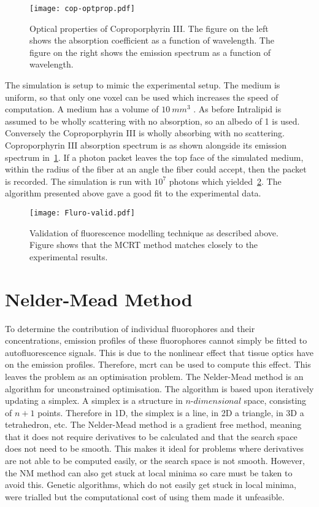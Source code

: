 \begin{figure}[!htpb]
	\centering
	\texttt{[image: cop-optprop.pdf]}
	\caption{Optical properties of Coproporphyrin III. The figure on the left shows the absorption coefficient as a function of wavelength. The figure on the right shows the emission spectrum as a function of wavelength.}
	\label{fig:coporiii}
\end{figure}

The simulation is setup to mimic the experimental setup.
The medium is uniform, so that only one voxel can be used which increases the speed of computation.
A medium has a volume of $10~mm^3$ .
As before Intralipid is assumed to be wholly scattering with no absorption, so an albedo of 1 is used.
Conversely the Coproporphyrin III is wholly absorbing with no scattering.
Coproporphyrin III absorption spectrum is as shown alongside its emission spectrum in~\cref{fig:coporiii}.
If a photon packet leaves the top face of the simulated medium, within the radius of the fiber at an angle the fiber could accept, then the packet is recorded.
The simulation is run with $10^7$ photons which yielded~\cref{fig:flurovalid}.
The algorithm presented above gave a good fit to the experimental data.

\begin{figure}[!htpb]
  \centering
  \texttt{[image: Fluro-valid.pdf]}
  \caption{Validation of fluorescence modelling technique as described above. Figure shows that the MCRT method matches closely to the experimental results.}
  \label{fig:flurovalid}
\end{figure}

\FloatBarrier

\section{Nelder-Mead Method}

To determine the contribution of individual fluorophores and their concentrations, emission profiles of these fluorophores cannot simply be fitted to autofluorescence signals.
This is due to the nonlinear effect that tissue optics have on the emission profiles.
Therefore, \gls*{mcrt} can be used to compute this effect.
This leaves the problem as an optimisation problem.
The Nelder-Mead method is an algorithm for unconstrained optimisation. 
The algorithm is based upon iteratively updating a simplex. 
A simplex is a structure in $n$-$dimensional$ space, consisting of $n+1$ points. 
Therefore in 1D, the simplex is a line, in 2D a triangle, in 3D a tetrahedron, etc. 
The Nelder-Mead method is a gradient free method, meaning that it does not require derivatives to be calculated and that the search space does not need to be smooth.
This makes it ideal for problems where derivatives are not able to be computed easily, or the search space is not smooth.
However, the NM method can also get stuck at local minima so care must be taken to avoid this.
Genetic algorithms, which do not easily get stuck in local minima, were trialled but the computational cost of using them made it unfeasible. 

